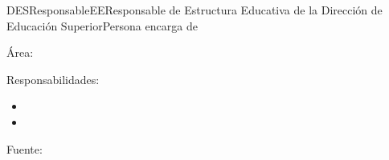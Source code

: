 \begin{actor}{DESResponsableEE}{Responsable de Estructura Educativa de la Dirección de Educación Superior}{Persona encarga de}
	
	\item[Área:] 
	\item[Responsabilidades:] \cdtEmpty
	\begin{itemize}
		\item 
		\item 
	\end{itemize}
	
	\item[Fuente:] 
	
	
\end{actor}

